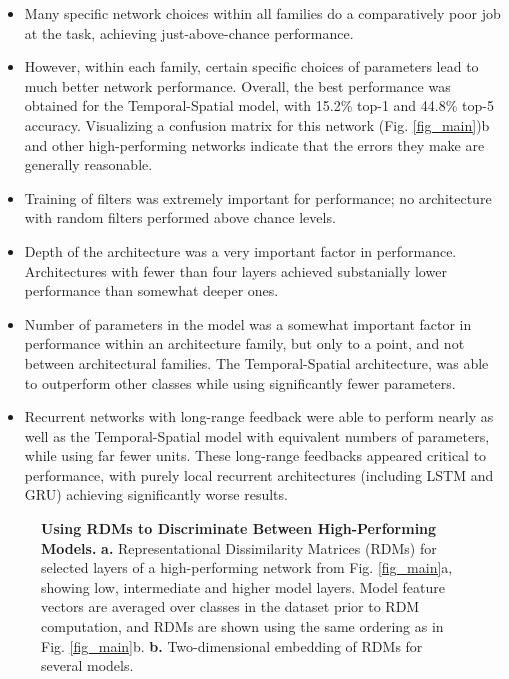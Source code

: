 \begin{itemize}[leftmargin=*,itemsep=0ex,topsep=1ex]
   \item Many specific network choices within all families do a comparatively poor job at the task, achieving just-above-chance performance.
   \item However, within each family, certain specific choices of parameters lead to much better network performance.
   Overall, the best performance was obtained for the Temporal-Spatial model, with 15.2\% top-1 and 44.8\% top-5 accuracy.
   Visualizing a confusion matrix for this network (Fig. \ref{fig_main})b  and other high-performing networks indicate that the errors they make are generally reasonable.
   \item Training of filters was extremely important for performance; no architecture with random filters performed above chance levels.
   \item Depth of the architecture was a very important factor in performance. Architectures with fewer than four layers achieved substanially lower performance than somewhat deeper ones.
   \item Number of parameters in the model was a somewhat important factor in performance within an architecture family, but only to a point, and not between architectural families.
   The Temporal-Spatial architecture, was able to outperform other classes while using significantly fewer parameters.
   \item Recurrent networks with long-range feedback were able to perform nearly as well as the Temporal-Spatial model with equivalent numbers of parameters, while using far fewer units.
   These long-range feedbacks appeared critical to performance, with purely local recurrent architectures (including LSTM and GRU) achieving significantly worse results.
\end{itemize}

\begin{figure}
\vspace{-2mm}
\caption{\textbf{Using RDMs to Discriminate Between High-Performing Models.} \textbf{a.} Representational Dissimilarity Matrices (RDMs) for selected layers of a high-performing network from Fig. \ref{fig_main}a, showing low, intermediate and higher model layers.  Model feature vectors are averaged over classes in the dataset prior to RDM computation, and RDMs are shown using the same ordering as in Fig. \ref{fig_main}b. \textbf{b.} Two-dimensional embedding of RDMs for several models.   ~\label{fig_rdms}}
\end{figure}


